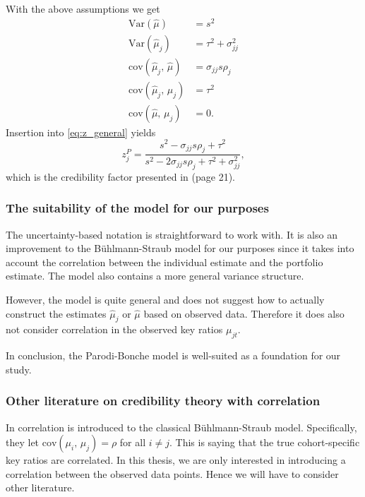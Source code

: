 \documentclass[11pt]{article}
\theoremstyle{definition}
\begin{document}
With the above assumptions we get
\begin{equation*}
    \begin{aligned}
        \text{Var}(\hat\mu) &= s^2 \\
        \text{Var}(\hat\mu_j) &= \tau^2 + \sigma_{jj}^2 \\
        \text{cov}(\hat\mu_j,\, \hat\mu) &= \sigma_{jj}s\rho_j  \\
        \text{cov}(\hat\mu_j,\, \mu_j) &= \tau^2 \\
        \text{cov}(\hat\mu,\, \mu_j) &= 0.
    \end{aligned}
\end{equation*}
Insertion into \eqref{eq:z_general} yields
\begin{equation}\label{eq:Parodi_z}
    z_j^P = \frac{s^2 - \sigma_{jj}s\rho_j + \tau^2}{s^2 -2\sigma_{jj}s\rho_j + \tau^2 + \sigma_{jj}^2},
\end{equation}
which is the credibility factor presented in \cite{parodi} (page 21).

\subsubsection*{The suitability of the model for our purposes}
The uncertainty-based notation is straightforward to work with. It is also an improvement to the Bühlmann-Straub model for our purposes since it takes into account the correlation between the individual estimate and the portfolio estimate. The model also contains a more general variance structure.

However, the model is quite general and does not suggest how to actually construct the estimates $\hat\mu_j$ or $\hat\mu$ based on observed data. Therefore it does also not consider correlation in the observed key ratios $\mu_{jt}$.

In conclusion, the Parodi-Bonche model is well-suited as a foundation for our study.

\subsubsection{Other literature on credibility theory with correlation}
In \cite{Nurrohmah} correlation is introduced to the classical Bühlmann-Straub model. Specifically, they let $\text{cov}(\mu_i,\, \mu_j)=\rho$ for all $i\neq j$. This is saying that the true cohort-specific key ratios are correlated. In this thesis, we are only interested in introducing a correlation between the observed data points. Hence we will have to consider other literature.
\end{document}
